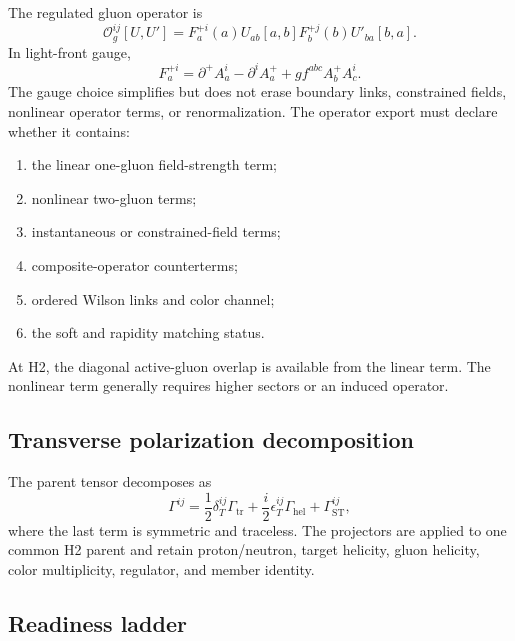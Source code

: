 \documentclass[11pt]{article}
\newcommand{\cO}{\mathcal O}
\begin{document}
The regulated gluon operator is
\begin{equation}
 \cO_g^{ij}[U,U']
 =
 F_a^{+i}(a)
 U_{ab}[a,b]
 F_b^{+j}(b)
 U'_{ba}[b,a].
 \label{eq:gluon-op}
\end{equation}
In light-front gauge,
\begin{equation}
 F_a^{+i}
 =
 \partial^+ A_a^i
 -\partial^i A_a^+
 +g f^{abc}A_b^+A_c^i.
\end{equation}
The gauge choice simplifies but does not erase boundary links, constrained
fields, nonlinear operator terms, or renormalization.  The operator export
must declare whether it contains:
\begin{enumerate}
 \item the linear one-gluon field-strength term;
 \item nonlinear two-gluon terms;
 \item instantaneous or constrained-field terms;
 \item composite-operator counterterms;
 \item ordered Wilson links and color channel;
 \item the soft and rapidity matching status.
\end{enumerate}
At H2, the diagonal active-gluon overlap is available from the linear term.
The nonlinear term generally requires higher sectors or an induced operator.

\subsection{Transverse polarization decomposition}

The parent tensor decomposes as
\begin{equation}
 \Gamma^{ij}
 =
 \frac12\delta_T^{ij}\Gamma_{\mathrm{tr}}
 +\frac{i}{2}\epsilon_T^{ij}\Gamma_{\mathrm{hel}}
 +\Gamma_{\mathrm{ST}}^{ij},
\end{equation}
where the last term is symmetric and traceless.  The projectors are applied to
one common H2 parent and retain proton/neutron, target helicity, gluon helicity,
color multiplicity, regulator, and member identity.

\subsection{Readiness ladder}
\end{document}
